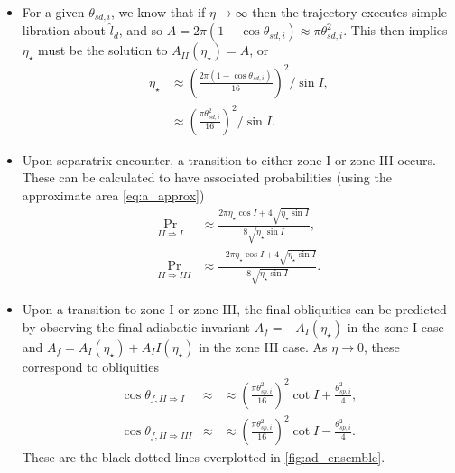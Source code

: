 \documentclass[
        fleqn,
        usenatbib,
    ]{mnras}
\newcommand*{\p}[1]{\left(#1\right)}
\begin{document}
\begin{itemize}
    \item For a given $\theta_{sd, i}$, we know that if $\eta \to \infty$ then
        the trajectory executes simple libration about $\hat{l}_d$, and so $A =
        2\pi\p{1 - \cos \theta_{sd, i}} \approx \pi \theta_{sd, i}^2$. This
        then implies $\eta_\star$ must be the solution to $A_{II}(\eta_\star) =
        A$, or
        \begin{align}
            \eta_\star &\approx \p{\frac{2\pi\p{1 - \cos \theta_{sd,i}}}{
                        16}}^2 / \sin I,\nonumber\\
                    &\approx \p{\frac{\pi \theta_{sd, i}^2}{16}}^2/\sin I.
        \end{align}

    \item Upon separatrix encounter, a transition to either zone I or zone III
        occurs. These can be calculated to have associated probabilities (using
        the approximate area \autoref{eq:a_approx})
        \begin{align}
            \Pr_{II \Rightarrow I} &\approx \frac{2\pi
                \eta_{\star} \cos I + 4\sqrt{\eta_{\star}\sin
                I}}{8\sqrt{\eta_{\star}\sin I}},\\
            \Pr_{II \Rightarrow III} &\approx \frac{-2\pi
                \eta_{\star} \cos I + 4\sqrt{\eta_{\star}\sin
                I}}{8\sqrt{\eta_{\star}\sin I}}.
        \end{align}

    \item Upon a transition to zone I or zone III, the final obliquities can be
        predicted by observing the final adiabatic invariant $A_f =
        -A_I(\eta_\star)$ in the zone I case and $A_f = A_I(\eta_\star) +
        A_II(\eta_\star)$ in the zone III case. As $\eta \to 0$, these
        correspond to obliquities
        \begin{align}
            \cos \theta_{f, II \Rightarrow I} &\approx
                &\approx\p{\frac{\pi \theta_{sp, i}^2}{16}}^2 \cot I
                    + \frac{\theta_{sp, i}^2}{4},\\
            \cos \theta_{f, II \Rightarrow III} &\approx
                &\approx\p{\frac{\pi \theta_{sp, i}^2}{16}}^2 \cot I
                    - \frac{\theta_{sp, i}^2}{4}.
        \end{align}
        These are the black dotted lines overplotted in
        \autoref{fig:ad_ensemble}.
\end{itemize}
\end{document}
